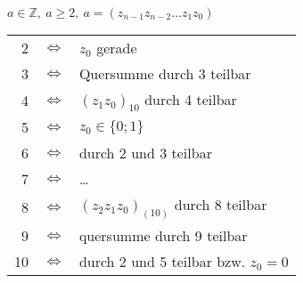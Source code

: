 $a \in \mathbb{Z},\ a \geq 2,\ a=(z_{n-1}z_{n-2} \dots z_1 z_0)$ \\
\begin{tabular}{rcl}
    2  & $\Leftrightarrow$ & $z_0$ gerade                           \\
    3  & $\Leftrightarrow$ & Quersumme durch 3 teilbar              \\
    4  & $\Leftrightarrow$ & $(z_1 z_0)_{10}$ durch 4 teilbar       \\
    5  & $\Leftrightarrow$ & $z_0 \in \lbrace 0; 1 \rbrace$         \\
    6  & $\Leftrightarrow$ & durch 2 und 3 teilbar                  \\
    7  & $\Leftrightarrow$ & \ldots                                 \\
    8  & $\Leftrightarrow$ & $(z_2 z_1 z_0)_{(10)}$ durch 8 teilbar \\
    9  & $\Leftrightarrow$ & quersumme durch 9 teilbar              \\
    10 & $\Leftrightarrow$ & durch 2 und 5 teilbar bzw. $z_0=0$
\end{tabular}
